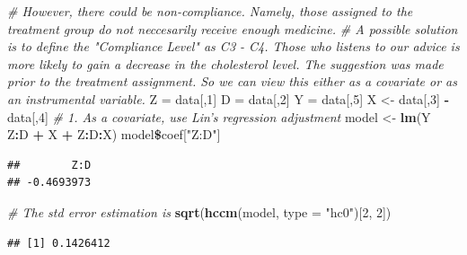 \documentclass[]{article}
\newenvironment{Shaded}{\begin{snugshade}}{\end{snugshade}}
\newcommand{\KeywordTok}[1]{\textcolor[rgb]{0.13,0.29,0.53}{\textbf{#1}}}
\newcommand{\DataTypeTok}[1]{\textcolor[rgb]{0.13,0.29,0.53}{#1}}
\newcommand{\DecValTok}[1]{\textcolor[rgb]{0.00,0.00,0.81}{#1}}
\newcommand{\StringTok}[1]{\textcolor[rgb]{0.31,0.60,0.02}{#1}}
\newcommand{\CommentTok}[1]{\textcolor[rgb]{0.56,0.35,0.01}{\textit{#1}}}
\newcommand{\OperatorTok}[1]{\textcolor[rgb]{0.81,0.36,0.00}{\textbf{#1}}}
\newcommand{\NormalTok}[1]{#1}
\begin{document}
\begin{Shaded}
\begin{Highlighting}[]
\CommentTok{# However, there could be non-compliance. Namely, those assigned to the treatment group do not neccesarily receive enough medicine.}
\CommentTok{# A possible solution is to define the "Compliance Level" as C3 - C4. Those who listens to our advice is more likely to gain a decrease in the cholesterol level. The suggestion was made prior to the treatment assignment. So we can view this either as a covariate or as an instrumental variable.}
\NormalTok{Z =}\StringTok{ }\NormalTok{data[,}\DecValTok{1}\NormalTok{]}
\NormalTok{D =}\StringTok{ }\NormalTok{data[,}\DecValTok{2}\NormalTok{]}
\NormalTok{Y =}\StringTok{ }\NormalTok{data[,}\DecValTok{5}\NormalTok{]}
\NormalTok{X <-}\StringTok{ }\NormalTok{data[,}\DecValTok{3}\NormalTok{] }\OperatorTok{-}\StringTok{ }\NormalTok{data[,}\DecValTok{4}\NormalTok{]}
\CommentTok{# 1. As a covariate, use Lin's regression adjustment}
\NormalTok{model <-}\StringTok{ }\KeywordTok{lm}\NormalTok{(Y}\OperatorTok{~}\StringTok{ }\NormalTok{Z}\OperatorTok{:}\NormalTok{D }\OperatorTok{+}\StringTok{ }\NormalTok{X }\OperatorTok{+}\StringTok{ }\NormalTok{Z}\OperatorTok{:}\NormalTok{D}\OperatorTok{:}\NormalTok{X)}
\NormalTok{model}\OperatorTok{\$}\NormalTok{coef[}\StringTok{"Z:D"}\NormalTok{]}
\end{Highlighting}
\end{Shaded}

\begin{verbatim}
##        Z:D 
## -0.4693973
\end{verbatim}

\begin{Shaded}
\begin{Highlighting}[]
\CommentTok{# The std error estimation is}
\KeywordTok{sqrt}\NormalTok{(}\KeywordTok{hccm}\NormalTok{(model, }\DataTypeTok{type =} \StringTok{"hc0"}\NormalTok{)[}\DecValTok{2}\NormalTok{, }\DecValTok{2}\NormalTok{])}
\end{Highlighting}
\end{Shaded}

\begin{verbatim}
## [1] 0.1426412
\end{verbatim}
\end{document}
